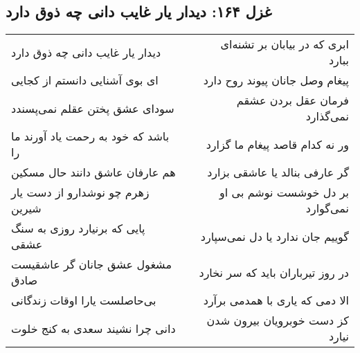 \begin{center}
\section*{غزل ۱۶۴: دیدار یار غایب دانی چه ذوق دارد}
\label{sec:164}
\begin{longtable}{l p{0.5cm} r}
دیدار یار غایب دانی چه ذوق دارد
&&
ابری که در بیابان بر تشنه‌ای ببارد
\\
ای بوی آشنایی دانستم از کجایی
&&
پیغام وصل جانان پیوند روح دارد
\\
سودای عشق پختن عقلم نمی‌پسندد
&&
فرمان عقل بردن عشقم نمی‌گذارد
\\
باشد که خود به رحمت یاد آورند ما را
&&
ور نه کدام قاصد پیغام ما گزارد
\\
هم عارفان عاشق دانند حال مسکین
&&
گر عارفی بنالد یا عاشقی بزارد
\\
زهرم چو نوشدارو از دست یار شیرین
&&
بر دل خوشست نوشم بی او نمی‌گوارد
\\
پایی که برنیارد روزی به سنگ عشقی
&&
گوییم جان ندارد یا دل نمی‌سپارد
\\
مشغول عشق جانان گر عاشقیست صادق
&&
در روز تیرباران باید که سر نخارد
\\
بی‌حاصلست یارا اوقات زندگانی
&&
الا دمی که یاری با همدمی برآرد
\\
دانی چرا نشیند سعدی به کنج خلوت
&&
کز دست خوبرویان بیرون شدن نیارد
\\
\end{longtable}
\end{center}
